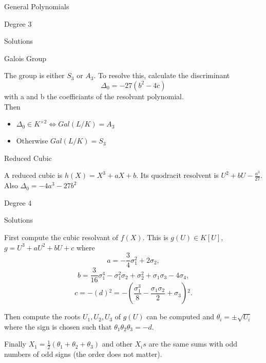 \documentclass[12pt, letterpaper]{article}
\begin{document}
\begin{section}{General Polynomials}
\begin{subsection}{Degree 3}
\begin{subsubsection}{Solutions}
    \end{subsubsection}

    \begin{subsubsection}{Galois Group}

      The group is either \(S_{3}\) or \(A_{3}\). To resolve this, calculate the
      discriminant \[\Delta_{0}  = -27 (b^{2} - 4c)\] with a and b the
      coefficiants of the resolvant polynomial. \\ Then
      \begin{itemize}
        \item \(\Delta_{0} \in K^{\times 2} \iff Gal(L / K) = A_{3}\)
        \item Otherwise \(Gal(L / K) = S_{3}\)
      \end{itemize}

    \end{subsubsection}

    \begin{subsubsection}{Reduced Cubic}

      A reduced cubic is \(h(X) = X^{3} + aX + b\). Its quodracit resolvent is
      \(U^{2} + bU - \frac{a^{3}}{27}\). \\
      Also \(\Delta_{0} = -4a^{3} - 27b^{2}\)

    \end{subsubsection}

  \end{subsection}

  \newpage

  \begin{subsection}{Degree 4}

    \begin{subsubsection}{Solutions}

      First compute the cubic resolvant of \(f(X)\). This is \(g(U) \in K[U]\),
      \(g = U^{3} + aU^{2} + bU + c\) where \[a = -\frac{3}{4} \sigma^{2}_{1} +
        2 \sigma_{2},\]
      \[b = \frac{3}{16} \sigma^{4}_{1} - \sigma^{2}_{1} \sigma_{2} +
        \sigma^{2}_{2} + \sigma_{1} \sigma_{3} - 4 \sigma_{4},\]
      \[c = -(d){}^{2} = -(\frac{\sigma^{3}_{1}}{8} -
        \frac{\sigma_{1} \sigma_{2}}{2} + \sigma_{3}){}^{2}.\]

      Then compute the roots \(U_{1}, U_{2}, U_{3}\) of \(g(U)\) can be computed
      and \(\theta_{i} = \pm \sqrt{U_{i}}\) where the sign is chosen such that
      \(\theta_{1} \theta_{2} \theta_{3} = -d\).

      Finally \(X_{1} = \frac{1}{2} (\theta_{1} + \theta_{2} + \theta_{3})\)
      and other \(X_{i}s\) are the same sums with odd numbers of odd signs (the
      order does not matter).


\end{subsubsection}
\end{subsection}
\end{section}
\end{document}
